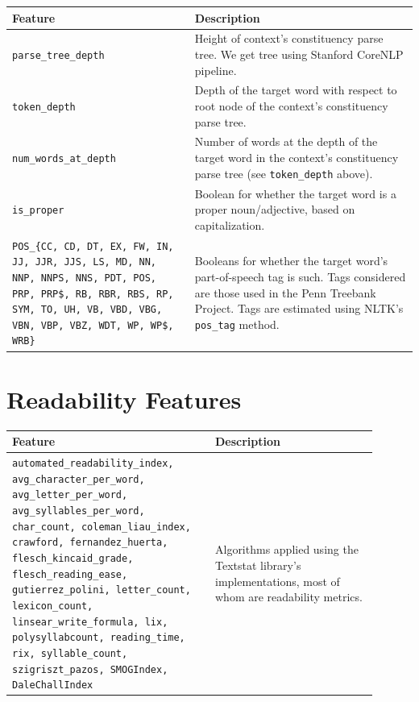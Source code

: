\documentclass{dcthesis}
\theoremstyle{definition}
\theoremstyle{remark}
\begin{document}
\begin{table}[H]
  \centering
  \begin{tabular}{>{\centering\arraybackslash}p{0.45\linewidth}>{\arraybackslash}p{0.55\linewidth}}
    \hline \textbf{Feature} & \textbf{Description} \\ \hline 
    \texttt{parse\_tree\_depth} & Height of context's constituency parse tree. We get tree using Stanford CoreNLP pipeline.\\
    \hline 
    \texttt{token\_depth} & Depth of the target word with respect to root node of the context's constituency parse tree.\\
    \hline 
    \texttt{num\_words\_at\_depth} & Number of words at the depth of the target word in the context's constituency parse tree (see \texttt{token\_depth} above).\\
    \hline 
    \texttt{is\_proper} & Boolean for whether the target word is a proper noun/adjective, based on capitalization.\\
    \hline 
    \texttt{POS\_\{CC, CD, DT, EX, FW, IN, JJ, JJR, JJS, LS, MD, NN, NNP, NNPS, NNS, PDT, POS, PRP, PRP\$, RB, RBR, RBS, RP, SYM, TO, UH, VB, VBD, VBG, VBN, VBP, VBZ, WDT, WP, WP\$, WRB\}} & Booleans for whether the target word's part-of-speech tag is such. Tags considered are those used in the Penn Treebank Project.\tablefootnote{\url{https://www.ling.upenn.edu/courses/Fall_2003/ling001/penn_treebank_pos.html}} Tags are estimated using NLTK's \texttt{pos\_tag} method.\\
    \hline 
  \end{tabular}
  \label{syntactic_features}
\end{table}

\section{Readability Features}

\begin{table}[H]
  \centering
  \begin{tabular}{>{\centering\arraybackslash}p{0.5\linewidth}>{\arraybackslash}p{0.4\linewidth}}
    \hline \textbf{Feature} & \textbf{Description} \\ \hline 
    \texttt{automated\_readability\_index, avg\_character\_per\_word, avg\_letter\_per\_word, avg\_syllables\_per\_word, char\_count, coleman\_liau\_index, crawford, fernandez\_huerta, flesch\_kincaid\_grade, flesch\_reading\_ease, gutierrez\_polini, letter\_count, lexicon\_count, linsear\_write\_formula, lix, polysyllabcount, reading\_time, rix, syllable\_count, szigriszt\_pazos, SMOGIndex, DaleChallIndex} & Algorithms applied using the Textstat library's implementations, most of whom are readability metrics.\\
    \hline 
  \end{tabular}
  \label{readability_features}
\end{table}
\end{document}

